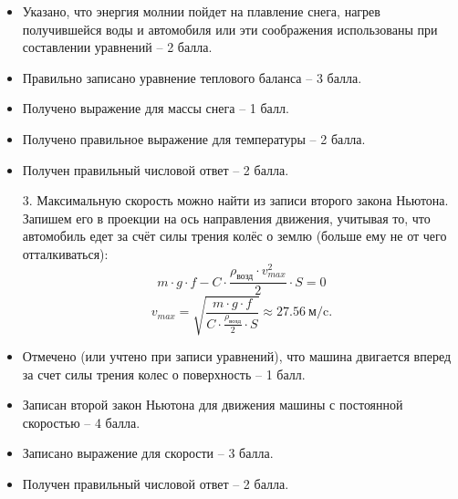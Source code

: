     \additionalCriteria
    \begin{itemize}
        \item Указано, что энергия молнии пойдет на плавление снега, нагрев получившейся воды и автомобиля 
        или эти соображения использованы при составлении уравнений – 2 балла.
        \item Правильно записано уравнение теплового баланса – 3 балла.
        \item Получено выражение для массы снега – 1 балл.
        \item Получено правильное выражение для температуры  – 2 балла.
        \item Получен правильный числовой ответ – 2 балла.      
    \end{itemize}

\begin{enumerate}
    \item[3.] Максимальную скорость можно найти из записи второго закона Ньютона. Запишем его в 
    проекции на ось направления движения, учитывая то, что автомобиль едет за счёт силы трения колёс 
    о землю (больше ему не от чего отталкиваться):
    $$m \cdot g \cdot f-C \cdot \frac{\rho_\text{возд} \cdot v^2_{max}}{2} \cdot S=0$$
    $$v_{max}=\sqrt{\frac{m \cdot g \cdot f}{C \cdot \frac{\rho_\text{возд}}{2} \cdot S}} \approx 27.56 \: \text{м/c}.$$

\end{enumerate}

\additionalCriteria
    \begin{itemize}
        \item Отмечено (или учтено при записи уравнений), что машина двигается вперед за счет силы трения колес о поверхность – 1 балл.
        \item Записан второй закон Ньютона для движения машины с постоянной скоростью – 4 балла.
        \item Записано выражение для скорости  –  3 балла.
        \item Получен правильный числовой ответ – 2 балла.             
    \end{itemize}

